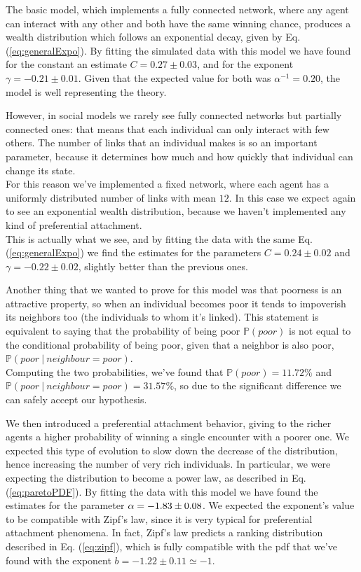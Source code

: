 The basic model, which implements a fully connected network, where any agent can interact with any other and both have the same winning chance, produces a wealth distribution which follows an exponential decay, given by Eq. (\ref{eq:generalExpo}).
By fitting the simulated data with this model we have found for the constant an estimate $C = 0.27 \pm 0.03$, and for the exponent $\gamma = -0.21 \pm 0.01$.
Given that the expected value for both was $\alpha^{-1} = 0.20$, the model is well representing the theory.

However, in social models we rarely see fully connected networks but partially connected ones: that means that each individual can only interact with few others.
The number of links that an individual makes is so an important parameter, because it determines how much and how quickly that individual can change its state. \\
For this reason we've implemented a fixed network, where each agent has a uniformly distributed number of links with mean $12$.
In this case we expect again to see an exponential wealth distribution, because we haven't implemented any kind of preferential attachment. \\
This is actually what we see, and by fitting the data with the same Eq. (\ref{eq:generalExpo}) we find the estimates for the parameters $C = 0.24 \pm 0.02$ and $\gamma = -0.22 \pm 0.02$, slightly better than the previous ones.

Another thing that we wanted to prove for this model was that poorness is an attractive property, so when an individual becomes poor it tends to impoverish its neighbors too (the individuals to whom it's linked).
This statement is equivalent to saying that the probability of being poor $\mathbb{P}(poor)$ is not equal to the conditional probability of being poor, given that a neighbor is also poor, $\mathbb{P}(poor \ | \ neighbour=poor)$. \\
Computing the two probabilities, we've found that $\mathbb{P}(poor) = 11.72 \%$ and \\ $\mathbb{P}(poor \ | \ neighbour=poor) = 31.57 \%$, so due to the significant difference we can safely accept our hypothesis.

We then introduced a preferential attachment behavior, giving to the richer agents a higher probability of winning a single encounter with a poorer one.
We expected this type of evolution to slow down the decrease of the distribution, hence increasing the number of very rich individuals.
In particular, we were expecting the distribution to become a power law, as described in Eq. (\ref{eq:paretoPDF}).
By fitting the data with this model we have found the estimates for the parameter $\alpha = -1.83 \pm 0.08$.
We expected the exponent's value to be compatible with Zipf's law, since it is very typical for preferential attachment phenomena.
In fact, Zipf's law predicts a ranking distribution described in Eq. (\ref{eq:zipf}), which is fully compatible with the pdf that we've found with the exponent $b = -1.22 \pm 0.11 \simeq -1$.

